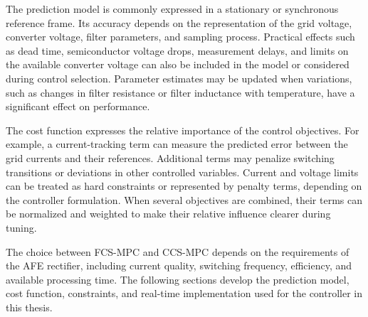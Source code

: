The prediction model is commonly expressed in a stationary or synchronous reference frame. Its accuracy depends on the representation of the grid voltage, converter voltage, filter parameters, and sampling process. Practical effects such as dead time, semiconductor voltage drops, measurement delays, and limits on the available converter voltage can also be included in the model or considered during control selection. Parameter estimates may be updated when variations, such as changes in filter resistance or filter inductance with temperature, have a significant effect on performance.

The cost function expresses the relative importance of the control objectives. For example, a current-tracking term can measure the predicted error between the grid currents and their references. Additional terms may penalize switching transitions or deviations in other controlled variables. Current and voltage limits can be treated as hard constraints or represented by penalty terms, depending on the controller formulation. When several objectives are combined, their terms can be normalized and weighted to make their relative influence clearer during tuning.

The choice between FCS-MPC and CCS-MPC depends on the requirements of the AFE rectifier, including current quality, switching frequency, efficiency, and available processing time. The following sections develop the prediction model, cost function, constraints, and real-time implementation used for the controller in this thesis.






